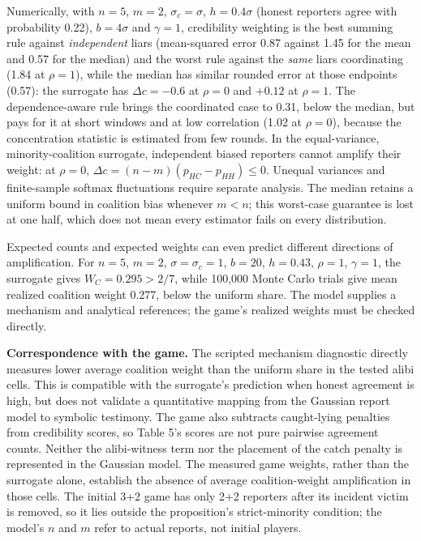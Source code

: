 \documentclass[
  12pt,
]{article}
\begin{document}
Numerically, with \(n = 5\), \(m = 2\), \(\sigma_c=\sigma\),
\(h = 0.4\sigma\) (honest reporters agree with probability 0.22),
\(b = 4\sigma\) and \(\gamma = 1\), credibility weighting is the best
summing rule against \emph{independent} liars (mean-squared error 0.87
against 1.45 for the mean and 0.57 for the median) and the worst rule
against the \emph{same} liars coordinating (1.84 at \(\rho = 1\)), while
the median has similar rounded error at those endpoints (0.57): the
surrogate has \(\Delta c = -0.6\) at \(\rho = 0\) and \(+0.12\) at
\(\rho = 1\). The dependence-aware rule brings the coordinated case to
0.31, below the median, but pays for it at short windows and at low
correlation (1.02 at \(\rho = 0\)), because the concentration statistic
is estimated from few rounds. In the equal-variance, minority-coalition
surrogate, independent biased reporters cannot amplify their weight: at
\(\rho=0\), \(\Delta c=(n-m)(p_{HC}-p_{HH})\le0\). Unequal variances and
finite-sample softmax fluctuations require separate analysis. The median
retains a uniform bound in coalition bias whenever \(m<n\); this
worst-case guarantee is lost at one half, which does not mean every
estimator fails on every distribution.

Expected counts and expected weights can even predict different
directions of amplification. For \(n=5\), \(m=2\),
\(\sigma=\sigma_c=1\), \(b=20\), \(h=0.43\), \(\rho=1\), \(\gamma=1\),
the surrogate gives \(W_C=0.295>2/7\), while 100,000 Monte Carlo trials
give mean realized coalition weight 0.277, below the uniform share. The
model supplies a mechanism and analytical references; the game's
realized weights must be checked directly.

\textbf{Correspondence with the game.} The scripted mechanism diagnostic
directly measures lower average coalition weight than the uniform share
in the tested alibi cells. This is compatible with the surrogate's
prediction when honest agreement is high, but does not validate a
quantitative mapping from the Gaussian report model to symbolic
testimony. The game also subtracts caught-lying penalties from
credibility scores, so Table 5's scores are not pure pairwise agreement
counts. Neither the alibi-witness term nor the placement of the catch
penalty is represented in the Gaussian model. The measured game weights,
rather than the surrogate alone, establish the absence of average
coalition-weight amplification in those cells. The initial 3+2 game has
only 2+2 reporters after its incident victim is removed, so it lies
outside the proposition's strict-minority condition; the model's \(n\)
and \(m\) refer to actual reports, not initial players.
\end{document}
